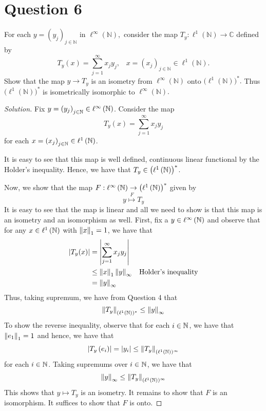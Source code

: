 \section{Question 6}
\horz
For each $y=(y_j)_{j\in\mathbb N}$ in $\ell^{\infty}(\mathbb N),$  consider the map $T_y : \ell^{1}(\mathbb N) \to \mathbb C$ defined by $$T_y(x) = \sum\limits_{j=1}^{\infty}x_jy_j,\,\,\,\, \,x = (x_j)_{j\in\mathbb N}\in \ell^{1}(\mathbb N).$$ Show that the map $y \to T_y$ is an isometry from $\ell^{\infty}(\mathbb N)$ onto  $\big(\ell^{1}(\mathbb N)\big)^*.$ Thus $\big(\ell^1(\mathbb N)\big)^*$ is isometrically isomorphic to $\ell^{\infty}(\mathbb N).$ 
\horz

\begin{proof}[Solution]
    Fix $y= \left( y_{j} \right)_{j\in \mathbb N} \in \ell ^{\infty} \left( \mathbb N \right)$. Consider the map 
    \begin{equation*}
	T_{y} \left( x \right) = \sum_{j=1}^{\infty} x_{j}y_{j}
    \end{equation*}
    for each $x= \left( x_{j} \right)_{j\in \mathbb N} \in \ell^{1} \left( \mathbb N \right)$.

    It is easy to see that this map is well defined, continuous linear functional by the Holder's inequality. Hence, we have that $T_{y} \in \left( \ell ^{1} \left( \mathbb N \right) \right)^{*}$. 

    Now, we show that the map $F: \ell ^{\infty} \left( \mathbb N \right) \to \left( \ell ^{1} \left( \mathbb N \right) \right)^{*}$ given by
    \begin{equation*}
	y \stackrel{F}{\longmapsto} T_{y}
    \end{equation*}
It is easy to see that the map is linear and all we need to show is that this map is an isometry and an isomorphism as well.
First, fix a $y \in \ell^{\infty} \left( \mathbb N \right)$ and observe that for any $x\in \ell ^{1} \left( \mathbb N \right)$ with $\left\lVert x \right\rVert_{1} = 1$, we have that
\begin{align*}
    \left\lvert T_{y} (x) \right\rvert &= \left\lvert \sum_{j=1}^{\infty} x_{j}y_{j} \right\rvert &\\
    & \le \left\lVert x \right\rVert_{1} \left\lVert y \right\rVert_{\infty} & \text{Holder's inequality} \\
    &= \left\lVert y \right\rVert_{\infty}
\end{align*}
Thus, taking supremum, we have from Question 4 that
\begin{equation*}
    \left\lVert T_{y} \right\rVert_{(\ell ^{1} \left( \mathbb N \right))^{*}} \le \left\lVert y \right\rVert_{\infty}
\end{equation*}
To show the reverse inequality, observe that for each $i \in \mathbb N$, we have that $\left\lVert e_{1} \right\rVert_{1} = 1$ and hence, we have that
\begin{align*}
    \left\lvert T_{y} \left( e_{i} \right) \right\rvert = \left\lvert y_{i} \right\rvert \le \left\lVert T_{y} \right\rVert_{(\ell ^{1} \left( \mathbb N \right))^{\infty}}
\end{align*}
for each $i\in \mathbb N$. Taking supremums over $i \in \mathbb N$, we have that
\begin{equation*}
    \left\lVert y \right\rVert_{\infty} \le  \left\lVert T_{y} \right\rVert_{(\ell ^{1} \left( \mathbb N \right))^{\infty}}
\end{equation*}
This shows that $y \mapsto T_{y}$ is an isometry. It remains to show that $F$ is an isomorphism. It suffices to show that $F$ is onto.


\end{proof}
